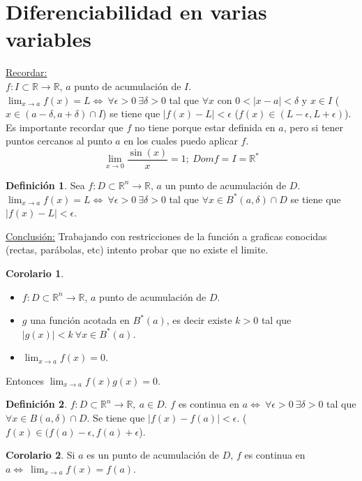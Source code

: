 \documentclass[10pt]{article}
\theoremstyle{definition}
\newtheorem{definition}{Definición}[section]
\newtheorem{corollary}{Corolario}[theorem]
\begin{document}
\section{Diferenciabilidad en varias variables}
\underline{Recordar:}
\\ $f:I\subset \mathbb{R}\to\mathbb{R}$, $a$ punto de acumulación de $I$.
\\$\lim_{x \to a} f(x)=L\Leftrightarrow\ \forall\epsilon >0\ \exists\delta >0$ tal que $\forall x$ con $0<|x-a|<\delta$ y $x\in I$ ($x\in (a-\delta, a+\delta)\cap I$) se tiene que $|f(x)-L|<\epsilon$ ($f(x)\in (L-\epsilon,L+\epsilon)$).
\\Es importante recordar que $f$ no tiene porque estar definida en $a$, pero si tener puntos cercanos al punto $a$ en los cuales puedo aplicar $f$.
$$\lim_{x \to 0} \frac{\sin(x)}{x}=1;\ Dom f=I=\mathbb{R}^*$$
\begin{definition}
    Sea $f:D\subset\mathbb{R}^n\to\mathbb{R}$, $a$ un punto de acumulación de $D$.
    \\$\lim_{x \to a} f(x)=L\Leftrightarrow\ \forall\epsilon >0\ \exists\delta >0$ tal que $\forall x\in B^*(a,\delta)\cap D$ se tiene que $|f(x)-L|<\epsilon$.
\end{definition}
\underline{Conclusión:} Trabajando con restricciones de la función a graficas conocidas (rectas, parábolas, etc) intento probar que no existe el limite.
\begin{corollary}{ \ }
    \begin{itemize}
        \item $f:D\subset\mathbb{R}^n\to\mathbb{R}$, $a$ punto de acumulación de $D$.
        \item $g$ una función acotada en $B^*(a)$, es decir existe $k>0$ tal que $|g(x)|<k\ \forall x\in B^*(a)$.
        \item $\lim_{x \to a} f(x)=0$.
    \end{itemize}    
Entonces $\lim_{x \to a} f(x)g(x)=0$.
\end{corollary}
\begin{definition}
    $f:D\subset\mathbb{R}^n\to\mathbb{R},\ a\in D$. $f$ es continua en $a\Leftrightarrow\ \forall\epsilon >0\ \exists\delta >0$ tal que $\forall x\in B(a,\delta)\cap D$. Se tiene que $|f(x)-f(a)|<\epsilon$. ($f(x)\in (f(a)-\epsilon, f(a)+\epsilon$).
\end{definition}
\begin{corollary}
    Si $a$ es un punto de acumulación de $D$, $f$ es continua en $a\Leftrightarrow\ \lim_{x \to a} f(x)=f(a)$.
\end{corollary}
\end{document}
